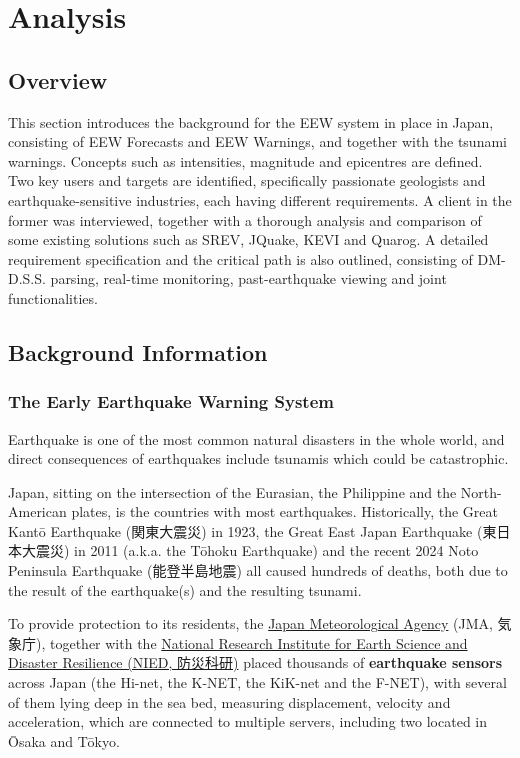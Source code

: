 \chapter{Analysis}
\section*{Overview}

This section introduces the background for the EEW system in place in Japan, consisting of EEW Forecasts and EEW Warnings, and together with the tsunami warnings. Concepts such as intensities, magnitude and epicentres are defined. Two key users and targets are identified, specifically passionate geologists and earthquake-sensitive industries, each having different requirements. A client in the former was interviewed, together with a thorough analysis and comparison of some existing solutions such as SREV, JQuake, KEVI and Quarog. A detailed requirement specification and the critical path is also outlined, consisting of DM-D.S.S. parsing, real-time monitoring, past-earthquake viewing and joint functionalities.

\section{Background Information}

\subsection{The Early Earthquake Warning System}

Earthquake is one of the most common natural disasters in the whole world, and direct consequences of earthquakes include tsunamis which could be catastrophic.

Japan, sitting on the intersection of the Eurasian, the Philippine and the North-American plates, is the countries with most earthquakes. Historically, the Great Kant\=o Earthquake (関東大震災) in 1923, the Great East Japan Earthquake (東日本大震災) in 2011 (a.k.a. the T\=ohoku Earthquake) and the recent 2024 Noto Peninsula Earthquake (能登半島地震) all caused hundreds of deaths, both due to the result of the earthquake(s) and the resulting tsunami.

To provide protection to its residents, the \href{https://www.jma.go.jp/jma/index.html}{Japan Meteorological Agency} (JMA, 気象庁), together with the \href{https://www.bosai.go.jp}{National Research Institute for Earth Science and Disaster Resilience (NIED, 防災科研)} placed thousands of \textbf{earthquake sensors} across Japan (the Hi-net, the K-NET, the KiK-net and the F-NET), with several of them lying deep in the sea bed, measuring displacement, velocity and acceleration, which are connected to multiple servers, including two located in \=Osaka and T\=okyo.

